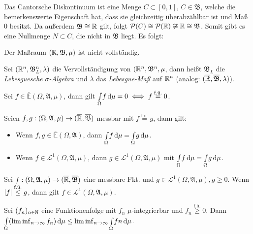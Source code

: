 \documentclass{cheat-sheet}
\newcommand{\PS}{\mathcal{P}} %
\newcommand{\Alg}{\mathfrak{A}} %
\newcommand{\Bor}{\mathfrak{B}} %
\newcommand{\E}{\mathbb{E}} %
\newcommand{\Leb}{\mathcal{L}} %
\newcommand{\fue}{\overset{\text{f.ü.}}} %
\theoremstyle{definition}
\newcommand{\IntOmu}[1]{\Int{\Omega}{}{#1}{\mu}} %
\begin{document}
\begin{bem}
  Das Cantorsche Diskontinuum ist eine Menge $C \subset [0, 1]$, $C \in \Bor$, welche die bemerkenswerte Eigenschaft hat, dass sie gleichzeitig überabzählbar ist und Maß $0$ besitzt. Da außerdem $\Bor \cong \R$ gilt, folgt $\PS(C) \cong \PS(\R) \not\cong \R \cong \Bor$. Somit gibt es eine Nullmenge $N \subset C$, die nicht in $\Bor$ liegt. Es folgt:
\end{bem}

\begin{satz}
  Der Maßraum $(\R, \Bor, \mu)$ ist nicht vollständig.
\end{satz}

\begin{defn}
  Sei $(\R^n, \Bor_L^n, \lambda)$ die Vervollständigung von $(\R^n, \Bor^n, \mu$, dann heißt $\Bor_L$ die \emph{Lebesguesche $\sigma$-Algebra} und $\lambda$ das \emph{Lebesgue-Maß} auf $\mathbb{R}^n$ (analog: $(\ER, \overline{\Bor}, \lambda)$).
\end{defn}

\begin{satz}
  Sei $f \in \overline{\E}(\Omega, \Alg, \mu)$, dann gilt $\IntOmu{f} = 0 \iff f \overset{\text{f.ü.}}= 0$.
\end{satz}

\vspace{-10pt}

\begin{satz}
  Seien $f, g : (\Omega, \Alg, \mu) \to (\ER, \overline{\Bor})$ messbar mit $f \fue= g$, dann gilt:
  \begin{itemize}
    \item Wenn $f, g \in \overline{\E}(\Omega, \Alg)$, dann $\IntOmu{f} = \IntOmu{g}$.
    \item Wenn $f \in \Leb^1(\Omega, \Alg, \mu)$, dann $g \in \Leb^1(\Omega, \Alg, \mu)$ mit $\IntOmu{f} = \IntOmu{g}$.
  \end{itemize}
\end{satz}

\begin{satz}
  Sei $f : (\Omega, \Alg, \mu) \to (\ER, \overline{\Bor})$ eine messbare Fkt. und $g \in \Leb^1(\Omega, \Alg, \mu), g \geq 0$. Wenn $\abs{f} \fue\leq g$, dann gilt $f \in \Leb^1(\Omega, \Alg, \mu)$.
\end{satz}

\begin{satz}\begin{doublespace}
  Sei $(f_n)_{n \in \mathbb{N}}$ eine Funktionenfolge mit $f_n$ $\mu$-integrierbar und $f_n \overset{\text{f.ü.}}\geq 0$. Dann $\IntOmu{(\liminf_{n \to \infty} f_n)} \leq \liminf_{n \to \infty} \IntOmu{fn}$.
\end{doublespace}\end{satz}
\end{document}
